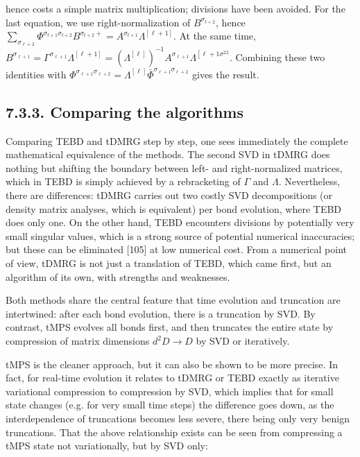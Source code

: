 \documentclass[12pt]{article}
\begin{document}
hence costs a simple matrix multiplication; divisions have been avoided. For the last equation, we use right-normalization of $B^{\sigma_{t+2}}$, hence $\sum_{\sigma_{\ell+2}} \Phi^{\sigma_{t+1} \sigma_{t+2}} B^{\sigma_{t+2}+}=A^{\sigma_{t+1}} \Lambda^{[\ell+1]}$. At the same time, $B^{\sigma_{\ell+1}}=\Gamma^{\sigma_{\ell+1}} \Lambda^{[\ell+1]}=\left(\Lambda^{[\ell]}\right)^{-1} A^{\sigma_{\ell+1}} \Lambda^{\left[\ell+1 \sigma^{2}{ }^{2}\right.}$. Combining these two identities with $\Phi^{\sigma_{\ell+1} \sigma_{\ell+2}}=\Lambda^{[\ell]} \bar{\Phi}^{\sigma_{\ell+1} \sigma_{\ell+2}}$ gives the result.

\subsection*{7.3.3. Comparing the algorithms}
Comparing TEBD and tDMRG step by step, one sees immediately the complete mathematical equivalence of the methods. The second SVD in tDMRG does nothing but shifting the boundary between left- and right-normalized matrices, which in TEBD is simply achieved by a rebracketing of $\Gamma$ and $\Lambda$. Nevertheless, there are differences: tDMRG carries out two costly SVD decompositions (or density matrix analyses, which is equivalent) per bond evolution, where TEBD does only one. On the other hand, TEBD encounters divisions by potentially very small singular values, which is a strong source of potential numerical inaccuracies; but these can be eliminated [105] at low numerical cost. From a numerical point of view, tDMRG is not just a translation of TEBD, which came first, but an algorithm of its own, with strengths and weaknesses.

Both methods share the central feature that time evolution and truncation are intertwined: after each bond evolution, there is a truncation by SVD. By contrast, tMPS evolves all bonds first, and then truncates the entire state by compression of matrix dimensions $d^{2} D \rightarrow D$ by SVD or iteratively.

tMPS is the cleaner approach, but it can also be shown to be more precise. In fact, for real-time evolution it relates to tDMRG or TEBD exactly as iterative variational compression to compression by SVD, which implies that for small state changes (e.g. for very small time steps) the difference goes down, as the interdependence of truncations becomes less severe, there being only very benign truncations. That the above relationship exists can be seen from compressing a tMPS state not variationally, but by SVD only:
\end{document}
